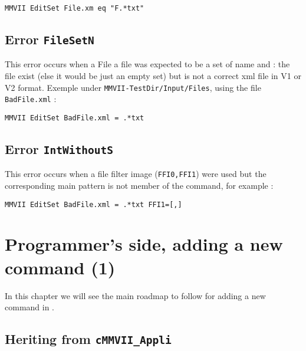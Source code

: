 \begin{verbatim}
MMVII EditSet File.xm eq "F.*txt"
\end{verbatim}



\subsection{Error {\tt FileSetN}}

This error occurs when a File a file was expected to be a set of name and : 
the file exist (else it would be just an empty set) but is not a correct
xml file in V1 or V2 format. Exemple under {\tt {\MMVIDIR}MMVII-TestDir/Input/Files},
using the file {\tt BadFile.xml} :

\begin{verbatim}
MMVII EditSet BadFile.xml = .*txt
\end{verbatim}


\subsection{Error {\tt IntWithoutS}}

This error occurs when a file filter image ({\tt FFI0,FFI1}) were used but
the corresponding main pattern is not member of the command, for example :

\begin{verbatim}
MMVII EditSet BadFile.xml = .*txt FFI1=[,]
\end{verbatim}



\section{Programmer's side, adding a new command (1)}

In this chapter we will see the main roadmap to follow for
adding a new command in \PPP.



\subsection{Heriting from  {\tt cMMVII\_Appli}}

